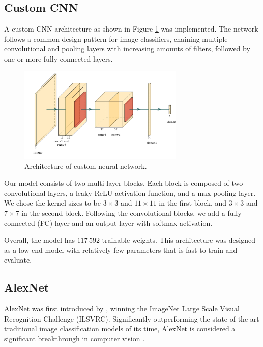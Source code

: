 \documentclass{l4proj}
\begin{document}
\subsection{Custom CNN}
\label{custom_cnn}

A custom CNN architecture as shown in Figure \ref{fig:customnet} was implemented. The network follows a common design pattern for image classifiers, chaining multiple convolutional and pooling layers with increasing amounts of filters, followed by one or more fully-connected layers. 

\begin{figure}[ht]
  \centering
  \includegraphics[width=0.7\textwidth]{images/models/customnet}
  \caption{Architecture of custom neural network.}
  \label{fig:customnet}
\end{figure}

Our model consists of two multi-layer blocks. Each block is composed of two convolutional layers, a leaky ReLU activation function, and a max pooling layer. We chose the kernel sizes to be $3 \times 3$ and $11 \times 11$ in the first block, and $3 \times 3$ and $7 \times 7$ in the second block. Following the convolutional blocks, we add a fully connected (FC) layer and an output layer with softmax activation. 

Overall, the model has $117\,592$ trainable weights. This architecture was designed as a low-end model with relatively few parameters that is fast to train and evaluate.

\subsection{AlexNet}
\label{alexnet}

AlexNet was first introduced by \citet{krizhevsky_imagenet_2012}, winning the ImageNet Large Scale Visual Recognition Challenge (ILSVRC). Significantly outperforming the state-of-the-art traditional image classification models of its time, AlexNet is considered a significant breakthrough in computer vision \citep{alom_history_2018}.
\end{document}
